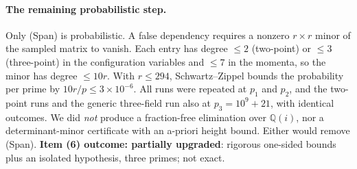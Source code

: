 \paragraph{The remaining probabilistic step.} Only (Span) is probabilistic. A false dependency requires a nonzero $r\times r$ minor of the sampled matrix to vanish. Each entry has degree $\le2$ (two-point) or $\le3$ (three-point) in the configuration variables and $\le7$ in the momenta, so the minor has degree $\le10r$. With $r\le294$, Schwartz--Zippel bounds the probability per prime by $10r/p\le3\times10^{-6}$. All runs were repeated at $p_1$ and $p_2$, and the two-point runs and the generic three-field run also at $p_3=10^9+21$, with identical outcomes. We did \emph{not} produce a fraction-free elimination over $\mathbb Q(i)$, nor a determinant-minor certificate with an a-priori height bound. Either would remove (Span). \textbf{Item (6) outcome: partially upgraded}: rigorous one-sided bounds plus an isolated hypothesis, three primes; not exact.
